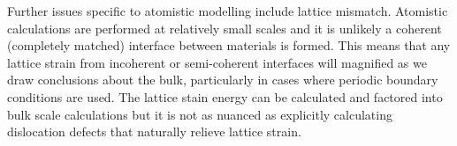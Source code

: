 \documentclass[../main.tex]{subfiles}
\begin{document}
Further issues specific to atomistic modelling include lattice mismatch. Atomistic calculations are performed at relatively small scales and it is unlikely a coherent (completely matched) interface between materials is formed. This means that any lattice strain from incoherent or semi-coherent interfaces will magnified as we draw conclusions about the bulk, particularly in cases where periodic boundary conditions are used. The lattice stain energy can be calculated and factored into bulk scale calculations but it is not as nuanced as explicitly calculating dislocation defects that naturally relieve lattice strain. 

\end{document}

